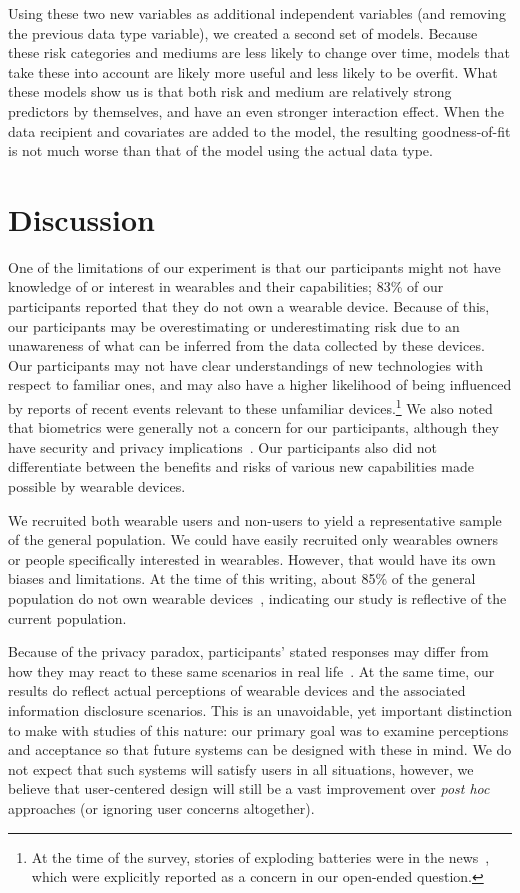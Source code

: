 \documentclass[conference]{IEEEtran}
\begin{document}
Using these two new variables as additional independent variables (and removing the previous data type variable), we created a second set of models. Because these risk categories and mediums are less likely to change over time, models that take these into account are likely more useful and less likely to be overfit. What these models show us is that both risk and medium are relatively strong predictors by themselves, and have an even stronger interaction effect. When the data recipient and covariates are added to the model, the resulting goodness-of-fit is not much worse than that of the model using the actual data type. 

\section{Discussion}

One of the limitations of our experiment is that our participants might not have knowledge of or interest in wearables and their capabilities; 83\% of our participants reported that they do not own a wearable device. Because of this, our participants may be overestimating or underestimating risk due to an unawareness of what can be inferred from the data collected by these devices. Our participants may not have clear understandings of new technologies with respect to familiar ones, and may also have a higher likelihood of being influenced by reports of recent events relevant to these unfamiliar devices.\footnote{At the time of the survey, stories of exploding batteries were in the news~\cite{1_levin_2014}, which were explicitly reported as a concern in our open-ended question.}  We also noted that biometrics were generally not a concern for our participants, although they have security and privacy implications~\cite{prabhakar2003biometric}. Our participants also did not differentiate between the benefits and risks of various new capabilities made possible by wearable devices.

We recruited both wearable users and non-users to yield a representative sample of the general population. We could have easily recruited only wearables owners or people specifically interested in wearables. However, that would have its own biases and limitations. At the time of this writing, about 85\% of the general population do not own wearable devices~\cite{Nilsen,WearableStatNews}, indicating our study is reflective of the current population. 

Because of the privacy paradox, participants' stated responses may differ from how they may react to these same scenarios in real life~\cite{norberg2007privacy, jensen2005privacy}. At the same time, our results do reflect actual perceptions of wearable devices and the associated information disclosure scenarios. This is an unavoidable, yet important distinction to make with studies of this nature: our primary goal was to examine perceptions and acceptance so that future systems can be designed with these in mind. We do not expect that such systems will satisfy users in all situations, however, we believe that user-centered design will still be a vast improvement over {\it post hoc} approaches (or ignoring user concerns altogether). 
\end{document}
